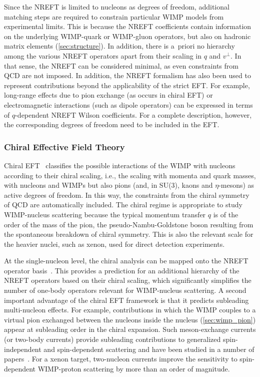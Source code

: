 Since the NREFT is limited to nucleons as degrees of freedom, additional matching steps are required to constrain particular WIMP models from experimental limits. This is because the NREFT coefficients contain information on the underlying WIMP-quark or WIMP-gluon operators, but also on hadronic matrix elements (\autoref{sec:structure}). In addition, there is a~priori no hierarchy among the various NREFT operators apart from their scaling in $q$ and $v^\perp$. In that sense, the NREFT can be considered minimal, as even constraints from QCD are not imposed. In addition, the NREFT formalism has also been used to represent contributions beyond the applicability of the strict EFT. For example, long-range effects due to pion exchange (as occurs in chiral EFT) or electromagnetic interactions (such as dipole operators) can be expressed in terms of $q$-dependent NREFT Wilson coefficients. For a complete description, however, the corresponding degrees of freedom need to be included in the EFT.  

\subsubsection{Chiral Effective Field Theory}\label{sec:cheft}

Chiral EFT~\cite{Epelbaum:2008ga,Machleidt:2011zz,Hammer:2012id} classifies the possible interactions of the WIMP with nucleons according to their chiral scaling, i.e., the scaling with momenta and quark masses, with nucleons and WIMPs but also pions (and, in SU(3), kaons and $\eta$-mesons) as active degrees of freedom. In this way, the constraints from the chiral symmetry of QCD are automatically included. The chiral regime is appropriate to study WIMP-nucleus scattering because the typical momentum transfer $q$ is of the order of the mass of the pion, the pseudo-Nambu-Goldstone boson resulting from the spontaneous breakdown of chiral symmetry. This is also the relevant scale for the heavier nuclei, such as xenon, used for direct detection experiments.

At the single-nucleon level, the chiral analysis can be mapped onto the NREFT operator basis~\cite{Hoferichter:2015ipa,Bishara:2016hek,Bishara:2017pfq}. This provides a prediction for an additional hierarchy of the NREFT operators based on their chiral scaling, which significantly simplifies the number of one-body operators relevant for WIMP-nucleus scattering. A second important advantage of the chiral EFT framework is that it predicts subleading multi-nucleon effects. For example, contributions in which the WIMP couples to a virtual pion exchanged between the nucleons inside the nucleus (\autoref{sec:wimp_pion}) appear at subleading order in the chiral expansion. Such meson-exchange currents (or two-body currents) provide subleading contributions to generalized spin-independent and spin-dependent scattering and have been studied in a number of papers~\cite{Prezeau:2003sv,Cirigliano:2012pq,Menendez:2012tm,Klos:2013rwa,Cirigliano:2013zta,Hoferichter:2015ipa,Hoferichter:2016nvd,Korber:2017ery,Hoferichter:2017olk,Andreoli:2018etf,Hoferichter:2018acd}. For a xenon target, two-nucleon currents improve the sensitivity to spin-dependent WIMP-proton scattering by more than an order of magnitude.


